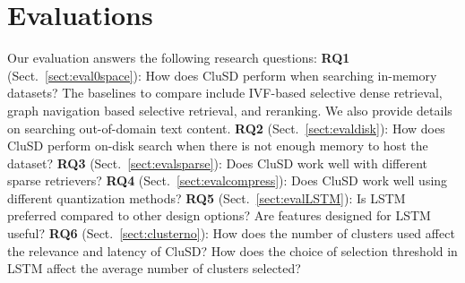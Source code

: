 \section{Evaluations}

Our evaluation answers  the following research questions:
\textbf{RQ1} (Sect.~\ref{sect:eval0space}): 
How does CluSD perform when searching in-memory datasets?
The baselines to compare include  IVF-based selective dense retrieval, 
graph navigation based selective retrieval, and reranking.
We also provide details on searching  out-of-domain text content.
\textbf{RQ2} (Sect.~\ref{sect:evaldisk}): 
How does  CluSD perform on-disk search when there is not enough memory to host  the dataset?
\textbf{RQ3} (Sect.~\ref{sect:evalsparse}): 
Does CluSD work well with  different sparse retrievers?
\textbf{RQ4} (Sect.~\ref{sect:evalcompress}): 
Does CluSD work  well using different quantization methods?
\textbf{RQ5} (Sect.~\ref{sect:evalLSTM}): 
Is  LSTM 
preferred compared to other design options?
Are  features designed for LSTM useful?
\textbf{RQ6} (Sect.~\ref{sect:clusterno}): 
How does the number of clusters used affect the relevance and latency of CluSD? 
How does the choice of selection threshold in LSTM affect the average number of clusters selected?



